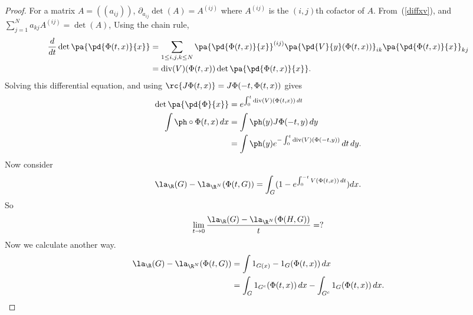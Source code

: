 \begin{proof}
For a matrix $A=((a_{ij}))$, $\partial_{a_{ij}}\det(A)=A^{(ij)}$ where $A^{(ij)}$ is the $(i,j)$th cofactor of $A$. From~(\ref{diffxv}), and $\sum_{j=1}^N a_{kj} A^{(ij)}=\det(A)$, 
Using the chain rule,
\begin{align*}
\frac{d}{dt}\det\pa{\pd{\Phi(t,x)}{x}}
&=\sum_{1\le i,j,k\le N}\pa{\pd{\Phi(t,x)}{x}}^{(ij)}
\pa{\pd{V}{y}(\Phi(t,x))}_{ik}\pa{\pd{\Phi(t,x)}{x}}_{kj}\\
&=\text{div}(V)(\Phi(t,x))\det\pa{\pd{\Phi(t,x)}{x}}.
\end{align*}
Solving this differential equation, and using $\rc{J\Phi(t,x)}=J\Phi(-t,\Phi(t,x))$ gives
\begin{align*}
\det\pa{\pd{\Phi}{x}}&=e^{\int_0^t \text{div}(V)(\Phi(t,x))\,dt}\\
\int\ph\circ \Phi(t,x)%
\,dx
&=\int \ph(y)J\Phi(-t,y)\,dy\\
&=\int\ph(y)e^{-\int_0^{t}\text{div}(V)(\Phi(-t,y))}\,dt\,dy.
\end{align*}
Now consider
\begin{align*}
\la_{\R}(G)-\la_{\R^N}(\Phi(t, G))=\int_G (1-e^{\int_0^{-t}V(\Phi(t,x))\,dt})dx.
\end{align*}
So
\[
\lim_{t\to 0} \frac{\la_{\R}(G)-\la_{\R^N}(\Phi(H,G))}{t}=?%
\]
Now we calculate another way.
\begin{align*}
\la_{\R}(G)-\la_{\R^N} (\Phi(t,G))
&=\int 1_{G(x)}-1_{G}(\Phi(t,x))\,dx\\
&=\int_G 1_{G^c}(\Phi(t,x))\,dx-\int_{G^c} 1_G(\Phi(t,x))\,dx.
\end{align*}


\end{proof}
